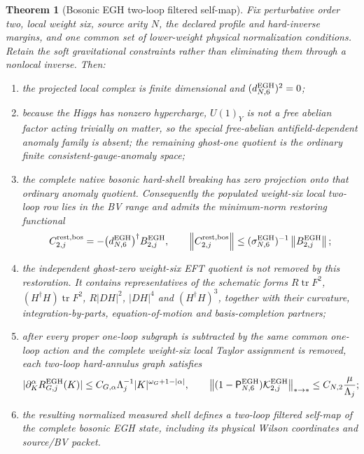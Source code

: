 \documentclass[11pt,a4paper,oneside]{book}
\theoremstyle{plain}
\newtheorem{theorem}{Theorem}[chapter]
\theoremstyle{definition}
\theoremstyle{remark}
\newcommand{\tr}{\operatorname{tr}}
\newcommand{\norm}[1]{\left\lVert#1\right\rVert}
\begin{document}
\begin{theorem}[Bosonic EGH two-loop filtered self-map]
\label{thm:bosonic-egh-two-loop}
Fix perturbative order two, local weight six, source arity $N$, the declared
profile and hard-inverse margins, and one common set of lower-weight physical
normalization conditions.  Retain the soft gravitational constraints rather
than eliminating them through a nonlocal inverse.  Then:
\begin{enumerate}[label=\textup{(B\arabic*)},leftmargin=3em]
\item the projected local complex is finite dimensional and
$(d^{\rm EGH}_{N,6})^2=0$;
\item because the Higgs has nonzero hypercharge, $U(1)_Y$ is not a free
abelian factor acting trivially on matter, so the special free-abelian
antifield-dependent anomaly family is absent; the remaining ghost-one quotient
is the ordinary finite consistent-gauge-anomaly space;
\item the complete native bosonic hard-shell breaking has zero projection onto
that ordinary anomaly quotient.  Consequently the populated weight-six
local two-loop row lies in the BV range and admits the minimum-norm restoring
functional
\begin{equation}
 C_{2,j}^{\rm rest,bos}
 =-\bigl(d^{\rm EGH}_{N,6}\bigr)^\dagger B^{\rm EGH}_{2,j},
 \qquad
 \norm{C_{2,j}^{\rm rest,bos}}
 \le (\sigma^{\rm EGH}_{N,6})^{-1}\norm{B^{\rm EGH}_{2,j}};
 \label{eq:egh-restorer}
\end{equation}
\item the independent ghost-zero weight-six EFT quotient is not removed by
this restoration.  It contains representatives of the schematic forms
$R\tr F^2$, $(H^\dagger H)\tr F^2$, $R|DH|^2$, $|DH|^4$ and
$(H^\dagger H)^3$, together with their curvature, integration-by-parts,
equation-of-motion and basis-completion partners;
\item after every proper one-loop subgraph is subtracted by the same common
one-loop action and the complete weight-six local Taylor assignment is
removed, each two-loop hard-annulus graph satisfies
\begin{equation}
 |\partial_K^\alpha R^{\rm EGH}_{G,j}(K)|
 \le C_{G,\alpha}\Lambda_j^{-1}
       |K|^{\omega_G+1-|\alpha|},
 \qquad
 \norm{(1-\mathsf P^{\rm EGH}_{N,6})
       \mathcal K^{\rm EGH}_{2,j}}_{*\to *}
 \le C_{N,2}\frac{\mu}{\Lambda_j};
 \label{eq:egh-hard-annulus}
\end{equation}
\item the resulting normalized measured shell defines a two-loop filtered
self-map of the complete bosonic EGH state, including its physical Wilson
coordinates and source/BV packet.
\end{enumerate}
\end{theorem}
\end{document}
